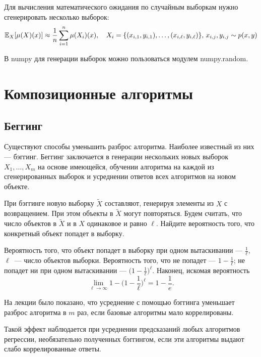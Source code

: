 \documentclass[12pt,fleqn]{article}
\begin{document}
Для вычисления математического ожидания по случайным выборкам нужно сгенерировать несколько выборок: 
\[
    \mathbb{E}_{X}
    [\mu(X)(x)]
    \approx
    \frac{1}{n}
    \sum_{i=1}^n
        \mu(X_i)(x),
        \quad
        X_i=\{(x_{i, 1}, y_{i, 1}), \dots, (x_{i, \ell}, y_{i, \ell})\}, \, x_{i,j}, y_{i, j} \sim p(x, y)
\]

В numpy для генерации выборок можно пользоваться модулем numpy.random. 

\section{Композиционные алгоритмы}
\subsection{Беггинг}
Существуют способы уменьшить разброс алгоритма. Наиболее известный из них --- бэггинг. Беггинг заключается в генерации нескольких новых выборок $X_1, \dots, X_m$ на основе имеющейся, обучении алгоритма на каждой из сгенерированных выборок и усреднении ответов всех алгоритмов на новом объекте.  

\begin{vkProblem}
    При бэггинге новую выборку $\widetilde X$ составляют, генерируя элементы из $X$ с возвращением. При этом объекты в $\widetilde X$ могут повторяться. Будем считать, что число объектов в $\widetilde X$ и в $X$ одинаковое и равно $\ell$. Найдите вероятность того, что конкретный объект попадет в выборку.
    \end{vkProblem}%
    \begin{esSolution}
        
        Вероятность того, что объект попадет в выборку при одном вытаскивании --- $\frac 1 \ell$, $\ell$~--- число объектов выборки. Вероятность того, что не попадет --- $1 - \frac 1 \ell$; не попадет ни при одном вытаскивании --- 
        $\biggl ( 1 - \frac 1 \ell \biggr)^\ell$. Наконец, искомая вероятность
        \[
        \lim_{\ell \rightarrow \infty} 1 - \biggl ( 1 - \frac 1 \ell \biggr)^\ell =
        1 - \frac{1}{e}.
        \]
    \end{esSolution}
    
    На лекции было показано, что усреднение с помощью бэггинга уменьшает разброс алгоритма в $m$ раз, если базовые алгоритмы мало коррелированы. 
    
    Такой эффект наблюдается при усреднении предсказаний любых алгоритмов регрессии, необязательно полученных бэггингом, если эти алгоритмы выдают слабо коррелированные ответы.
    
\end{document}
